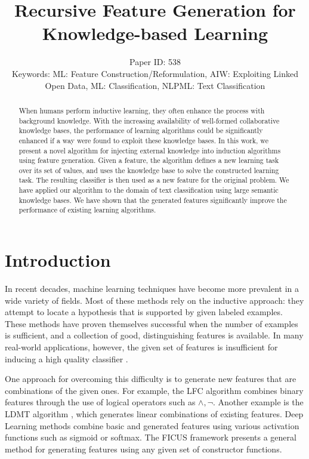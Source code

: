 \documentclass[letterpaper]{article} %
\title{Recursive Feature Generation for Knowledge-based Learning}
\author{Paper ID: 538 \\
	Keywords: ML: Feature Construction/Reformulation, AIW: Exploiting Linked Open Data, ML: Classification, NLPML: Text Classification
}
\theoremstyle{definition}
\begin{document}
\maketitle
\begin{abstract}
	When humans perform inductive learning, they often enhance the process with background
	knowledge. With the increasing availability of well-formed collaborative knowledge bases, the
	performance of learning algorithms could be significantly enhanced if a way were found to exploit
	these knowledge bases. In this work, we present a novel algorithm for injecting external knowledge
	into induction algorithms using feature generation. Given a feature, the algorithm defines a new
	learning task over its set of values, and uses the knowledge base to solve the constructed learning
	task. The resulting classifier is then used as a new feature for the original problem. We have
	applied our algorithm to the domain of text classification using large semantic knowledge bases. We
	have shown that the generated features significantly improve the performance of existing learning
	algorithms.
\end{abstract}

\section{Introduction}
\label{sec:Intro}
In recent decades, machine learning techniques have become more prevalent in a wide variety of fields. %
Most of these methods rely on the inductive approach: they attempt to locate a hypothesis that is  supported by given labeled examples. These methods have proven themselves successful when the number of examples is sufficient, and a collection of good,
distinguishing features is available.
In many real-world applications, however, the given set of features is insufficient for inducing a high quality classifier \cite{levi2004learning,paulheim2012unsupervisedfull}.

One approach for overcoming this difficulty is to generate new features that are combinations of the given ones.
For example, the LFC algorithm \cite{ragavan1993complex} combines binary features through the use of logical operators such as $\land ,\lnot$.
Another example is the LDMT algorithm \cite{utgo1991linear}, which generates linear combinations of existing features.
Deep Learning methods combine basic and generated features using various activation functions such as sigmoid or softmax.
The FICUS framework \cite{markovitch2002feature} presents a general method for generating features using any given set of constructor functions.
\end{document}
